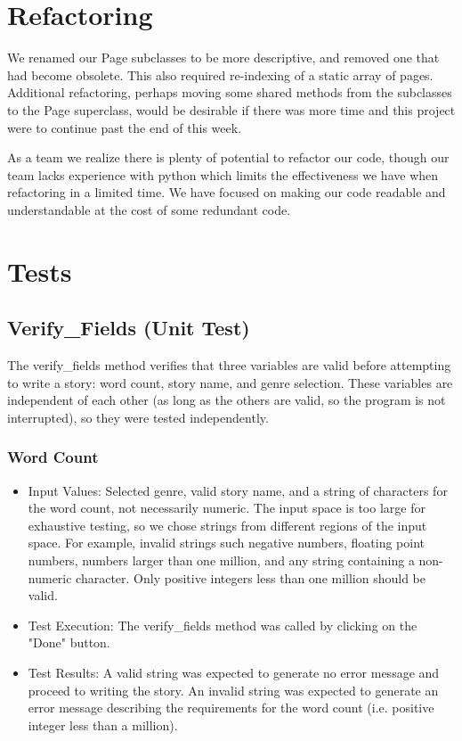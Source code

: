 \documentclass[12pt]{article}
\begin{document}
\section{Refactoring}

We renamed our Page subclasses to be more descriptive, and removed one that had become obsolete. This also required re-indexing of a static array of pages. Additional refactoring, perhaps moving some shared methods from the subclasses to the Page superclass, would be desirable if there was more time and this project were to continue past the end of this week. 

As a team we realize there is plenty of potential to refactor our code, though  our team lacks experience with python which limits the effectiveness we have when refactoring in a limited time. We have focused on making our code readable and understandable at the cost of some redundant code.

\section{Tests}

\subsection{Verify\_Fields (Unit Test)}

The verify\_fields method verifies that three variables are valid before attempting to write a story: word count, story name, and genre selection. These variables are independent of each other (as long as the others are valid, so the program is not interrupted), so they were tested independently.

\subsubsection{Word Count}
\begin{itemize}
\item Input Values: Selected genre, valid story name, and a string of characters for the word count, not necessarily numeric. The input space is too large for exhaustive testing, so we chose strings from different regions of the input space. For example, invalid strings such negative numbers, floating point numbers, numbers larger than one million, and any string containing a non-numeric character. Only positive integers less than one million should be valid.
\item Test Execution: The verify\_fields method was called by clicking on the "Done" button.
\item Test Results: A valid string was expected to generate no error message and proceed to writing the story. An invalid string was expected to generate an error message describing the requirements for the word count (i.e. positive integer less than a million).
\end{itemize}
\end{document}
